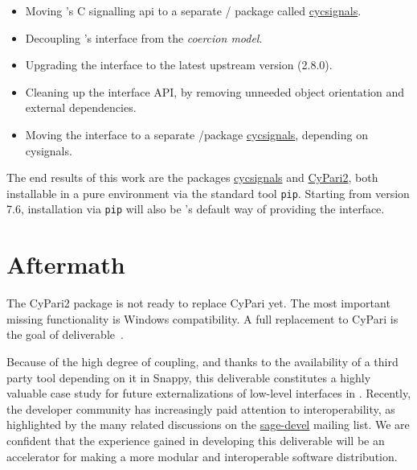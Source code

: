 \documentclass{deliverablereport}
\begin{document}
\begin{itemize}
\tightlist
\item Moving \Sage's C signalling api to a separate \Python/\Cython
  package called
  \href{https://github.com/sagemath/cysignals}{cycsignals}.
\item Decoupling \Sage's \Pari interface from the \emph{coercion
    model}.
\item Upgrading the \Pari interface to the latest upstream version
  (2.8.0).
\item Cleaning up the \Pari interface API, by removing unneeded object
  orientation and external dependencies.
\item Moving the \Pari interface to a separate \Python/\Cython package
  \href{https://github.com/sagemath/cysignals}{cycsignals}, depending
  on cysignals.
\end{itemize}

The end results of this work are the packages
\href{https://github.com/sagemath/cysignals}{cycsignals} and
\href{https://github.com/sagemath/cypari2}{CyPari2}, both installable
in a pure \Python environment via the standard tool
\texttt{pip}. Starting from version 7.6, installation via \texttt{pip}
will also be \Sage's default way of providing the \Pari interface.


\section{Aftermath}

The CyPari2 package is not ready to replace CyPari yet. The most
important missing functionality is Windows compatibility. A full
replacement to CyPari is the goal of
deliverable~.

Because of the high degree of coupling, and thanks to the availability
of a third party tool depending on it in Snappy, this deliverable
constitutes a highly valuable case study for future externalizations
of low-level interfaces in \Sage. Recently, the \Sage developer
community has increasingly paid attention to interoperability, as
highlighted by the many related discussions on the
\href{https://groups.google.com/forum/#!forum/sage-devel}{sage-devel}
mailing list.  We are confident that the experience gained in
developing this deliverable will be an accelerator for making \Sage a
more modular and interoperable software distribution.
\end{document}
